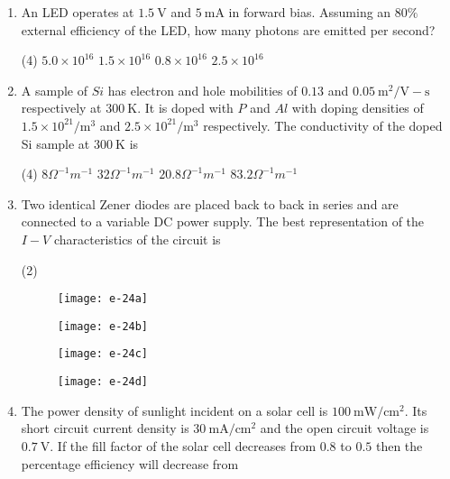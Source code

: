 \begin{enumerate}
	\item An LED operates at $1.5 \mathrm{~V}$ and $5 \mathrm{~mA}$ in forward bias. Assuming an $80 \%$ external efficiency of the LED, how many photons are emitted per second?
	{	}
	\begin{tasks}(4)
		\task[\textbf{A.}] $5.0 \times 10^{16}$
		\task[\textbf{B.}]  $1.5 \times 10^{16}$
		\task[\textbf{C.}] $0.8 \times 10^{16}$
		\task[\textbf{D.}] $2.5 \times 10^{16}$
	\end{tasks}
	\item A sample of $S i$ has electron and hole mobilities of $0.13$ and $0.05 \mathrm{~m}^{2} / \mathrm{V}-\mathrm{s}$ respectively at $300 \mathrm{~K}$. It is doped with $P$ and $A l$ with doping densities of $1.5 \times 10^{21} / \mathrm{m}^{3}$ and $2.5 \times 10^{21} / \mathrm{m}^{3}$ respectively. The conductivity of the doped Si sample at $300 \mathrm{~K}$ is
	{	}
	\begin{tasks}(4)
		\task[\textbf{A.}] $8 \Omega^{-1} m^{-1}$
		\task[\textbf{B.}] $32 \Omega^{-1} m^{-1}$
		\task[\textbf{C.}] $20.8 \Omega^{-1} m^{-1}$
		\task[\textbf{D.}] $83.2 \Omega^{-1} m^{-1}$
	\end{tasks}
	\item Two identical Zener diodes are placed back to back in series and are connected to a variable DC power supply. The best representation of the $I-V$ characteristics of the circuit is
	{	}
	\begin{tasks}(2)
		\task[\textbf{A.}] \begin{figure}[H]
			\centering
			\texttt{[image: e-24a]}
		\end{figure}
		\task[\textbf{B.}] \begin{figure}[H]
			\centering
			\texttt{[image: e-24b]}
		\end{figure}
		\task[\textbf{C.}] \begin{figure}[H]
			\centering
			\texttt{[image: e-24c]}
		\end{figure}
		\task[\textbf{D.}] \begin{figure}[H]
			\centering
			\texttt{[image: e-24d]}
		\end{figure}
	\end{tasks}
	\item The power density of sunlight incident on a solar cell is $100 \mathrm{~mW} / \mathrm{cm}^{2}$. Its short circuit current density is $30 \mathrm{~mA} / \mathrm{cm}^{2}$ and the open circuit voltage is $0.7 \mathrm{~V}$. If the fill factor of the solar cell decreases from $0.8$ to $0.5$ then the percentage efficiency will decrease from

\end{enumerate}
